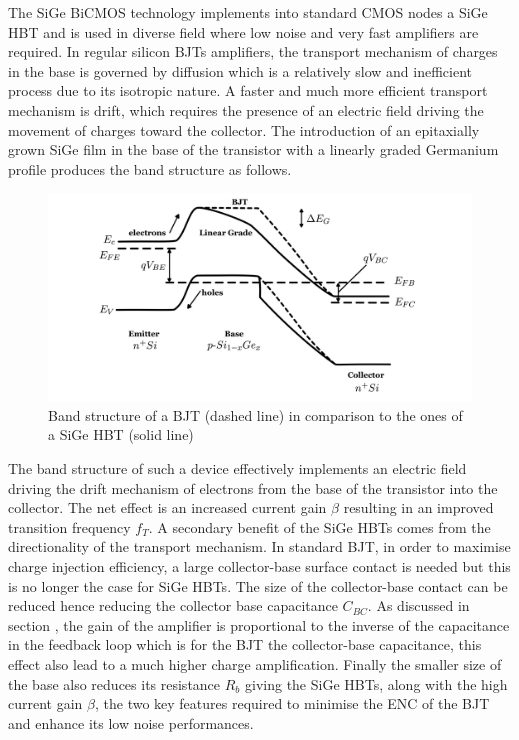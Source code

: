 		The SiGe BiCMOS technology implements into standard CMOS nodes a SiGe HBT and is used in diverse field where low noise and very fast amplifiers are required. In regular silicon BJTs amplifiers, the transport mechanism of charges in the base is governed by diffusion which is a relatively slow and inefficient process due to its isotropic nature. A faster and much more efficient transport mechanism is drift, which requires the presence of an electric field driving the movement of charges toward the collector. The introduction of an epitaxially grown SiGe film in the base of the transistor with a linearly graded Germanium profile produces the band structure as follows. 
		\begin{figure}[h]
		\centering
		\includegraphics[width=0.9\linewidth]{files/SiGeBand_Structure}
		\caption{Band structure of a BJT (dashed line) in comparison to the ones of a SiGe HBT (solid line) \cite{SiGEHBT_band_Structure}}
		\label{im:SiGe_bandstructure}
		\end{figure}
		
		The band structure of such a device effectively implements an electric field driving the drift mechanism of electrons from the base of the transistor into the collector. The net effect is an increased current gain $\beta$ resulting in an improved transition frequency $f_T$. A secondary benefit of the SiGe HBTs comes from the directionality of the transport mechanism. In standard BJT, in order to maximise charge injection efficiency, a large collector-base surface contact is needed but this is no longer the case for SiGe HBTs. The size of the collector-base contact can be reduced hence reducing the collector base capacitance $C_{BC}$. As discussed in section , the gain of the amplifier is proportional to the inverse of the capacitance in the feedback loop which is for the BJT the collector-base capacitance, this effect also lead to a much higher charge amplification. Finally the smaller size of the base also reduces its resistance $R_b$ giving the SiGe HBTs, along with the high current gain $\beta$, the two key features required to minimise the ENC of the BJT and enhance its low noise performances.
		
